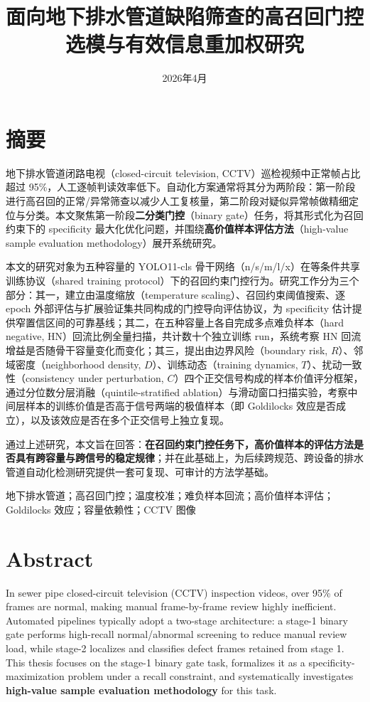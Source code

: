 \documentclass[UTF8,openany,12pt]{ctexbook}
\title{面向地下排水管道缺陷筛查的高召回门控选模与有效信息重加权研究}
\author{}
\date{2026年4月}
\newcommand{\keywords}[1]{\par\noindent{\heiti 关键词：}#1}
\begin{document}
\songti

\frontmatter

\chapter*{摘要}
地下排水管道闭路电视（closed-circuit television, CCTV）巡检视频中正常帧占比超过 95\%，人工逐帧判读效率低下。自动化方案通常将其分为两阶段：第一阶段进行高召回的正常/异常筛查以减少人工复核量，第二阶段对疑似异常帧做精细定位与分类。本文聚焦第一阶段\textbf{二分类门控}（binary gate）任务，将其形式化为召回约束下的 specificity 最大化优化问题，并围绕\textbf{高价值样本评估方法}（high-value sample evaluation methodology）展开系统研究。

本文的研究对象为五种容量的 YOLO11-cls 骨干网络（n/s/m/l/x）在等条件共享训练协议（shared training protocol）下的召回约束门控行为。研究工作分为三个部分：其一，建立由温度缩放（temperature scaling）、召回约束阈值搜索、逐 epoch 外部评估与扩展验证集共同构成的门控导向评估协议，为 specificity 估计提供窄置信区间的可靠基线；其二，在五种容量上各自完成多点难负样本（hard negative, HN）回流比例全量扫描，共计数十个独立训练 run，系统考察 HN 回流增益是否随骨干容量变化而变化；其三，提出由边界风险（boundary risk, $R$）、邻域密度（neighborhood density, $D$）、训练动态（training dynamics, $T$）、扰动一致性（consistency under perturbation, $C$）四个正交信号构成的样本价值评分框架，通过分位数分层消融（quintile-stratified ablation）与滑动窗口扫描实验，考察中间层样本的训练价值是否高于信号两端的极值样本（即 Goldilocks 效应是否成立），以及该效应是否在多个正交信号上独立复现。

通过上述研究，本文旨在回答：\textbf{在召回约束门控任务下，高价值样本的评估方法是否具有跨容量与跨信号的稳定规律}；并在此基础上，为后续跨规范、跨设备的排水管道自动化检测研究提供一套可复现、可审计的方法学基础。
\keywords{地下排水管道；高召回门控；温度校准；难负样本回流；高价值样本评估；Goldilocks 效应；容量依赖性；CCTV 图像}

\chapter*{Abstract}
In sewer pipe closed-circuit television (CCTV) inspection videos, over 95\% of frames are normal, making manual frame-by-frame review highly inefficient. Automated pipelines typically adopt a two-stage architecture: a stage-1 binary gate performs high-recall normal/abnormal screening to reduce manual review load, while stage-2 localizes and classifies defect frames retained from stage 1. This thesis focuses on the stage-1 binary gate task, formalizes it as a specificity-maximization problem under a recall constraint, and systematically investigates \textbf{high-value sample evaluation methodology} for this task.
\end{document}
